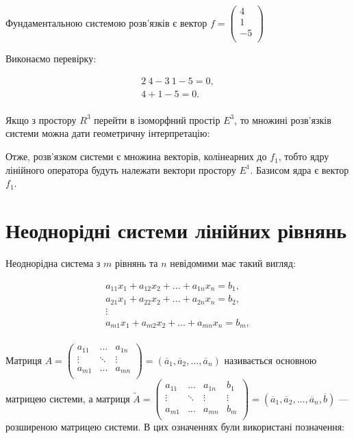 Фундаментальною системою розв’язків є вектор $f = \begin{pmatrix}
	4  \\
	1  \\
	-5 \\
\end{pmatrix}$



Виконаємо перевірку:

$$\begin{matrix}
	2 ~ 4 - 3 ~ 1 - 5 = 0, \\
	4 + 1 - 5 = 0. \\
\end{matrix}$$

Якщо з простору $R^3$ перейти в ізоморфний простір $E^3$, то множині розв’язків
системи можна дати геометричну інтерпретацію:

\parbox{8cm}{}


Отже, розв’язком системи є множина векторів, колінеарних до $f_1$, тобто ядру
лінійного оператора будуть належати вектори простору $E^1$. Базисом ядра є вектор $f_1$.

\section{Неоднорідні системи лінійних рівнянь}

Неоднорідна система з $m$ рівнянь та $n$ невідомими має такий вигляд:

$$\begin{matrix}
	a_{11} x_1 + a_{12} x_2 + ... + a_{1n} x_n = b_1, \\
	a_{21} x_1 + a_{22} x_2 + ... + a_{2n} x_n = b_2, \\
	\vdots \\
	a_{m1} x_1 + a_{m2} x_2 + ... + a_{mn} x_n = b_m, \\
\end{matrix}$$


Матриця $A = \begin{pmatrix}
	a_{11} & ...    & a_{1n} \\
	\vdots & \ddots & \vdots \\
	a_{m1} & ...    & a_{mn} \\
\end{pmatrix} = (\overline{a}_1, \overline{a}_2, ..., \overline{a}_n)$ називається основною
матрицею системи, а матриця $\tilde{A} = \begin{pmatrix}
	a_{11} & ...    & a_{1n} & b_1    \\
	\vdots & \ddots & \vdots & \vdots \\
	a_{m1} & ...    & a_{mn} & b_m    \\
\end{pmatrix} = (\overline{a}_1, \overline{a}_2, ..., \overline{a}_n, \overline{b})$ ---
розширеною матрицею системи. В цих означеннях були використані позначення:

